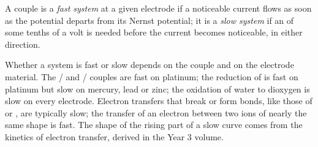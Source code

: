 \begin{definition}\label{def:b2:current-potential-curves:fast-slow}
A couple is a \emph{fast system} at a given electrode if a
noticeable current flows as soon as the potential departs from its Nernst
potential; it is a \emph{slow system} if an  of
some tenths of a volt is needed before the current becomes noticeable, in
either direction.
\end{definition}

Whether a system is fast or slow depends on the couple and on the electrode
material. The / and / couples are fast on
platinum; the reduction of  is fast on platinum but slow on mercury,
lead or zinc; the oxidation of water to dioxygen is slow on every electrode.
Electron transfers that break or form bonds, like those of  or ,
are typically slow; the transfer of an electron between two ions of nearly the
same shape is fast. The shape of the rising part of a slow curve comes from
the kinetics of electron transfer, derived in the Year 3 volume.

